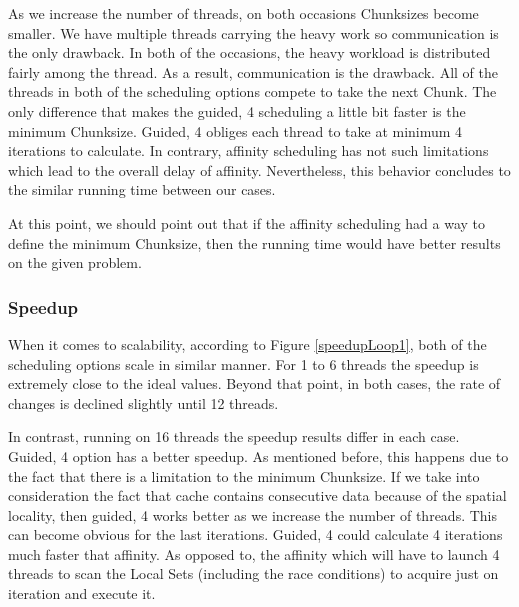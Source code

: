 \documentclass[12pt,a4paper]{article}
\begin{document}
As we increase the number of threads, on both occasions Chunksizes become smaller. We have multiple threads carrying the heavy work so communication is the only drawback. In both of the occasions, the heavy workload is distributed fairly among the thread. As a result, communication is the drawback. All of the threads in both of the scheduling options compete to take the next Chunk. The only difference that makes the guided, 4 scheduling a little bit faster is the minimum Chunksize. Guided, 4 obliges each thread to take at minimum 4 iterations to calculate. In contrary, affinity scheduling has not such limitations which lead to the overall delay of affinity. Nevertheless, this behavior concludes to the similar running time between our cases.

At this point, we should point out that if the affinity scheduling had a way to define the minimum Chunksize, then the running time would have better results on the given problem.    

\subsubsection{Speedup}

When it comes to scalability, according to Figure \ref{speedupLoop1}, both of the scheduling options scale in similar manner. For 1 to 6 threads the speedup is extremely close to the ideal values. Beyond that point, in both cases, the rate of changes is declined slightly until 12 threads.

In contrast, running on 16 threads the speedup results differ in each case. Guided, 4 option has a better speedup. As mentioned before, this happens due to the fact that there is a limitation to the minimum Chunksize. If we take into consideration the fact that cache contains consecutive data because of the spatial locality, then guided, 4 works better as we increase the number of threads. This can become obvious for the last iterations. Guided, 4 could calculate 4 iterations much faster that affinity. As opposed to, the affinity which will have to launch 4 threads to scan the Local Sets (including the race conditions) to acquire just on iteration and execute it.
\end{document}
